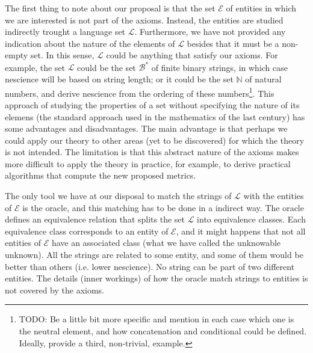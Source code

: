 The first thing to note about our proposal is that the set $\mathcal{E}$ of entities in which we are interested is not part of the axioms. Instead, the entities are studied indirectly trought a language set $\mathcal{L}$. Furthermore, we have not provided any indication about the nature of the elements of $\mathcal{L}$ besides that it must be a non-empty set. In this sense, $\mathcal{L}$ could be anything that satisfy our axioms. For example, the set $\mathcal{L}$ could be the set $\mathcal{B}^\ast$ of finite binary strings, in which case nescience will be based on string length; or it could be the set $\mathbb{N}$ of natural numbers, and derive nescience from the ordering of these numbers\footnote{\color{red} TODO: Be a little bit more specific and mention in each case which one is the neutral element, and how concatenation and conditional could be defined. Ideally, provide a third, non-trivial, example.}. This approach of studying the properties of a set without specifying the nature of its elemens (the standard approach used in the mathematics of the last century) has some advantages and disadvantages. The main advantage is that perhaps we could apply our theory to other areas (yet to be discovered) for which the theory is not intended. The limitation is that this abstract nature of the axioms makes more difficult to apply the theory in practice, for example, to derive practical algorithms that compute the new proposed metrics.

The only tool we have at our disposal to match the strings of $\mathcal{L}$ with the entities of $\mathcal{E}$ is the oracle, and this matching has to be done in a indirect way. The oracle defines an equivalence relation that splits the set $\mathcal{L}$ into equivalence classes. Each equivalence class corresponds to an entity of $\mathcal{E}$, and it might happens that not all entities of $\mathcal{E}$ have an associated class (what we have called the unknowable unknown). All the strings are related to some entity, and some of them would be better than others (i.e. lower nescience). No string can be part of two different entities. The details (inner workings) of how the oracle match strings to entities is not covered by the axioms.

